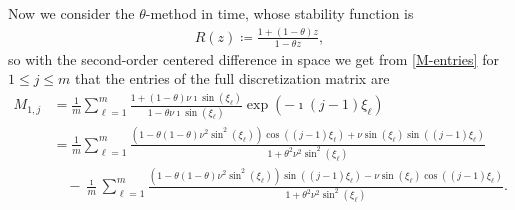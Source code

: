\documentclass[a4paper]{article}
\newtheorem{lemma}{Lemma}
\begin{document}
%
%
Now we consider the $\theta$-method \cite[Chapter IV.3]{hairerwanner} in time, whose stability function %
is
\begin{align}\label{R}
    R(z)  \coloneqq \frac{1+(1-\theta)z}{1-\theta z},
\end{align}
so with the second-order centered difference in space we get from \eqref{M-entries} for $1\le j\le m$ that
the entries of the full discretization matrix are 
\begin{equation}\label{matrix_entries}
\begin{split}
	M_{1,j} &= \frac{1}{m} \sum_{\ell=1}^m \frac{1+(1-\theta)\nu \imath\sin(\xi_\ell)}
		{1-\theta\nu \imath\sin(\xi_\ell)}\exp\left(-\imath(j-1)\xi_\ell\right) \\
		&= \frac{1}{m} \sum_{\ell=1}^{m} \frac{\left(1-\theta(1-\theta)\nu^2\sin^2(\xi_\ell)\right)
		\cos((j-1)\xi_\ell) + \nu \sin(\xi_\ell)\sin((j-1)\xi_\ell)}{1+\theta^2\nu^2 \sin^2(\xi_\ell)} \\
		&\quad - \frac{\imath}{m} \sum_{\ell=1}^{m} \frac{\left(1-\theta(1-\theta)\nu^2\sin^2(\xi_\ell)
		\right)\sin((j-1)\xi_\ell) - \nu \sin(\xi_\ell)\cos((j-1)\xi_\ell)}
		{1+\theta^2\nu^2 \sin^2(\xi_\ell)}.
\end{split}
\end{equation}
\end{document}
